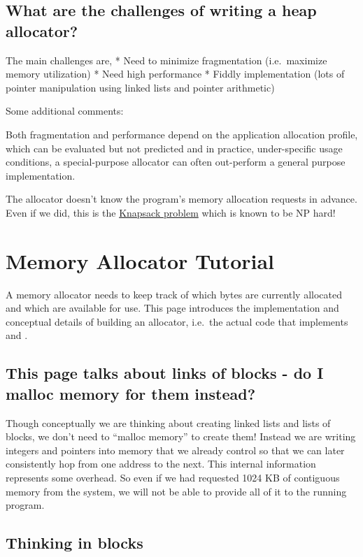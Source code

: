 \subsection{What are the challenges of writing a heap allocator?}

The main challenges are, * Need to minimize fragmentation (i.e.~maximize memory utilization) * Need high performance * Fiddly implementation (lots of pointer manipulation using linked lists and pointer arithmetic)

Some additional comments:

Both fragmentation and performance depend on the application allocation profile, which can be evaluated but not predicted and in practice, under-specific usage conditions, a special-purpose allocator can often out-perform a general purpose implementation.

The allocator doesn't know the program's memory allocation requests in advance. Even if we did, this is the \href{http://en.wikipedia.org/wiki/Knapsack_problem}{Knapsack problem} which is known to be NP hard!

\section{Memory Allocator Tutorial}

A memory allocator needs to keep track of which bytes are currently allocated and which are available for use. This page introduces the implementation and conceptual details of building an allocator, i.e.~the actual code that implements  and .

\subsection{This page talks about links of blocks - do I malloc memory for them instead?}

Though conceptually we are thinking about creating linked lists and lists of blocks, we don't need to ``malloc memory'' to create them! Instead we are writing integers and pointers into memory that we already control so that we can later consistently hop from one address to the next. This internal information represents some overhead. So even if we had requested 1024 KB of contiguous memory from the system, we will not be able to provide all of it to the running program.

\subsection{Thinking in blocks}

